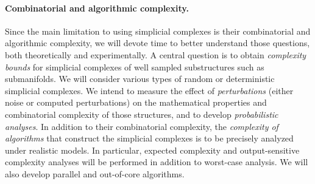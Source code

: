 

\paragraph{Combinatorial and algorithmic complexity.}

Since the main limitation to using simplicial complexes is their combinatorial and algorithmic complexity, we will devote time to better understand those questions, both theoretically and experimentally.  %
A central question is to obtain {\em complexity bounds} for simplicial complexes of well sampled substructures such as submanifolds. We will consider various types of random or deterministic simplicial complexes.  We intend to measure the effect of {\em perturbations} (either noise or computed perturbations) on the mathematical properties and combinatorial complexity of those structures, and to develop {\em probabilistic analyses}.  In addition to their combinatorial complexity, the {\em complexity of algorithms} that construct the simplicial complexes is to be precisely analyzed under realistic models. In particular, expected complexity and output-sensitive complexity analyses will be performed in addition to worst-case analysis. %
We will also develop parallel and out-of-core algorithms.%


